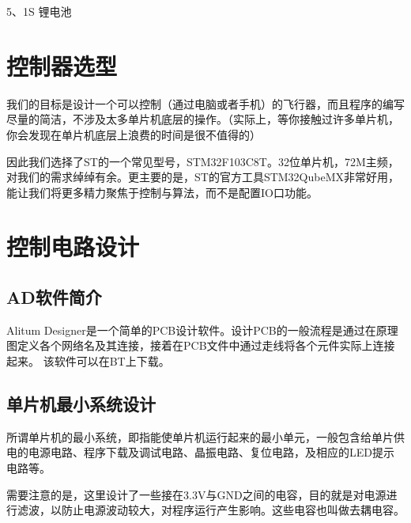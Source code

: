 \documentclass{article}
\begin{document}
5、1S 锂电池

\section{控制器选型}
我们的目标是设计一个可以控制（通过电脑或者手机）的飞行器，而且程序的编写尽量的简洁，不涉及太多单片机底层的操作。（实际上，等你接触过许多单片机，你会发现在单片机底层上浪费的时间是很不值得的）

因此我们选择了ST的一个常见型号，STM32F103C8T。32位单片机，72M主频，对我们的需求绰绰有余。更主要的是，ST的官方工具STM32QubeMX非常好用，能让我们将更多精力聚焦于控制与算法，而不是配置IO口功能。

\section{控制电路设计}
\subsection{AD软件简介}
Alitum Designer是一个简单的PCB设计软件。设计PCB的一般流程是通过在原理图定义各个网络名及其连接，接着在PCB文件中通过走线将各个元件实际上连接起来。
该软件可以在BT上下载。

\subsection{单片机最小系统设计}
所谓单片机的最小系统，即指能使单片机运行起来的最小单元，一般包含给单片供电的电源电路、程序下载及调试电路、晶振电路、复位电路，及相应的LED提示电路等。

需要注意的是，这里设计了一些接在3.3V与GND之间的电容，目的就是对电源进行滤波，以防止电源波动较大，对程序运行产生影响。这些电容也叫做去耦电容。
\end{document}

